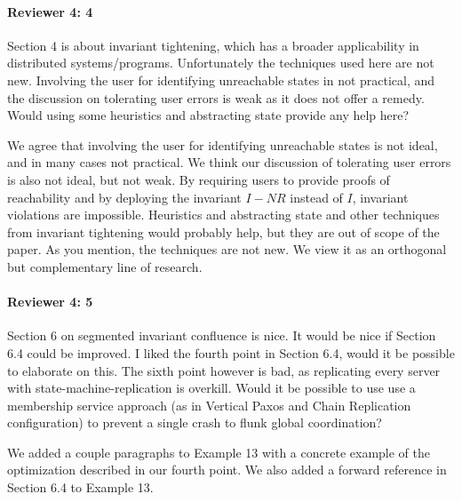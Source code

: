 \documentclass[9pt]{article}
\begin{document}
\begin{multicols*}{2}
\paragraph{Reviewer 4: 4}
\begin{feedback}
  Section 4 is about invariant tightening, which has a broader applicability in
  distributed systems/programs. Unfortunately the techniques used here are not
  new. Involving the user for identifying unreachable states in not practical,
  and the discussion on tolerating user errors is weak as it does not offer a
  remedy. Would using some heuristics and abstracting state provide any help
  here?
\end{feedback}
We agree that involving the user for identifying unreachable states is not
ideal, and in many cases not practical. We think our discussion of tolerating
user errors is also not ideal, but not weak. By requiring users to provide
proofs of reachability and by deploying the invariant $I - NR$ instead of $I$,
invariant violations are impossible.
%
Heuristics and abstracting state and other techniques from invariant tightening
would probably help, but they are out of scope of the paper. As you mention,
the techniques are not new. We view it as an orthogonal but complementary line
of research.

\paragraph{Reviewer 4: 5}
\begin{feedback}
  Section 6 on segmented invariant confluence is nice. It would be nice if
  Section 6.4 could be improved. I liked the fourth point in Section 6.4, would
  it be possible to elaborate on this. The sixth point however is bad, as
  replicating every server with state-machine-replication is overkill. Would it
  be possible to use use a membership service approach (as in Vertical Paxos
  and Chain Replication configuration) to prevent a single crash to flunk
  global coordination?
\end{feedback}
We added a couple paragraphs to Example 13 with a concrete example of the
optimization described in our fourth point. We also added a forward reference
in Section 6.4 to Example 13.


\end{multicols*}
\end{document}
